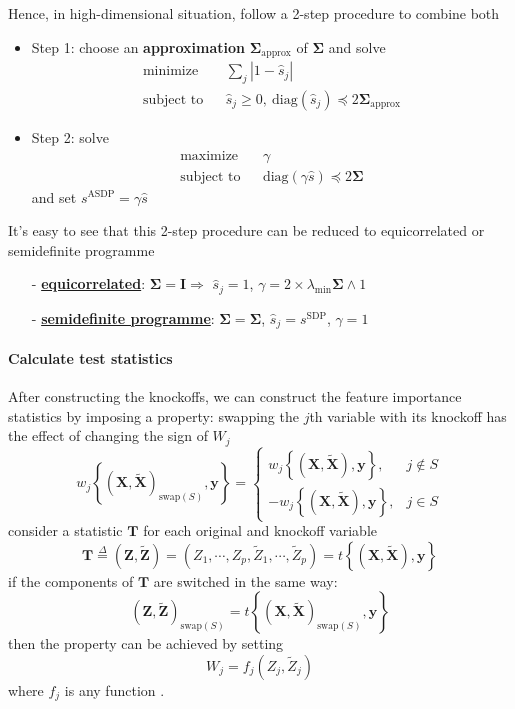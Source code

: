 \documentclass[twoside]{article}
\begin{document}
Hence, in high-dimensional situation, follow a 2-step procedure to combine both
\begin{itemize}
    \item Step 1: choose an {{\textbf{approximation}}} $\boldsymbol{\Sigma}_{\mathrm{approx}}$ of $\boldsymbol{\Sigma}$  and solve
    \begin{align*}
        \text{minimize} && \sum_j\left\vert 1-\hat{s}_j \right\vert \\
        \text{subject to} && \hat{s}_j\geq 0, \ \mathrm{diag}\left(\hat{s}_j\right)\preceq 2\boldsymbol{\Sigma}_{\mathrm{approx}}
    \end{align*}
    \item Step 2: solve 
    \begin{align*}
        \text{maximize} && \gamma \\
        \text{subject to} && \mathrm{diag}\left(\gamma \hat{s}\right)\preceq 2\boldsymbol{\Sigma}
    \end{align*}
    and set $s^{\mathrm{ASDP}}=\gamma \hat{s}$
\end{itemize}
It's easy to see that this 2-step procedure can be reduced to equicorrelated or semidefinite programme
\begin{itemize}
    \small
    \item[-] \textcolor{myblue}{\underline{\textbf{equicorrelated}}}: $\boldsymbol{\Sigma}=\mathbf{I}\Rightarrow$ $\hat{s}_j =1$, $\gamma = 2\times \lambda_{\min}\boldsymbol{\Sigma}\wedge 1$
    \item[-] \textcolor{myblue}{\underline{\textbf{semidefinite programme}}}: $\boldsymbol{\Sigma}=\boldsymbol{\Sigma}$, $\hat{s}_j = s^{\mathrm{SDP}}$, $\gamma=1$
\end{itemize}

\paragraph*{Calculate test statistics}
After constructing the knockoffs, we can construct the feature importance statistics by imposing a  property: swapping the $j$th variable with its knockoff has the effect of changing the sign of $W_j$ 
$$
 w_j\left\{ (\mathbf{X},\tilde{\mathbf{X}})_{\mathrm{swap}(S)},\mathbf{y} \right\} = \begin{cases}
    w_j\left\{ (\mathbf{X},\tilde{\mathbf{X}}),\mathbf{y} \right\}, & j\not\in S \\
    -w_j \left\{ (\mathbf{X},\tilde{\mathbf{X}}),\mathbf{y} \right\}, & j\in S
 \end{cases}
$$
consider a statistic $\mathbf{T}$ for each original and knockoff variable $$ \mathbf{T} \overset{\Delta}{=} (\mathbf{Z},\tilde{\mathbf{Z}}) = (Z_1,\cdots,Z_p,\tilde{Z}_1,\cdots,\tilde{Z}_p) = t\left\{ (\mathbf{X},\tilde{\mathbf{X}}), \mathbf{y}\right\} $$
if the components of $\mathbf{T}$ are switched in the same way: $$ (\mathbf{Z},\tilde{\mathbf{Z}})_{\mathrm{swap}(S)} = t\left\{ (\mathbf{X},\tilde{\mathbf{X}})_{\mathrm{swap}(S)},\mathbf{y} \right\} $$
then the  property can be achieved by setting $$W_j = f_j(Z_j,\tilde{Z}_j)$$ where $f_j$ is any  function .
\end{document}
